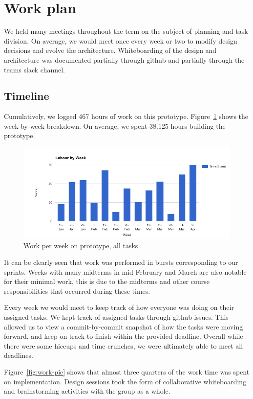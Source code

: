 \section{Work plan}
We held many meetings throughout the term on the subject of planning and task division.
On average, we would meet once every week or two to modify design decisions and evolve the architecture.
Whiteboarding of the design and architecture was documented partially through github and partially through the teams slack channel.

\subsection{Timeline}
Cumulatively, we logged 467 hours of work on this prototype.
Figure~\ref{fig:work-per-week} shows the week-by-week breakdown.
On average, we spent 38.125 hours building the prototype. 

\begin{figure}[tbph]
  \centering
  \includegraphics[width=0.85\linewidth]{graphics/work-per-week}
  \caption{Work per week on prototype, all tasks}
  \label{fig:work-per-week}
\end{figure}

It can be clearly seen that work was performed in bursts corresponding to our sprints.
Weeks with many midterms in mid February and March are also notable for their minimal work, this is due to the midterms and other course responsibilities that occurred during these times.

Every week we would meet to keep track of how everyone was doing on their assigned tasks.
We kept track of assigned tasks through github issues.
This allowed us to view a commit-by-commit snapshot of how the tasks were moving forward, and keep on track to finish within the provided deadline.
Overall while there were some hiccups and time crunches, we were ultimately able to meet all deadlines.

Figure~\ref{fig:work-pie} shows that almost three quarters of the work time was spent on implementation.
Design sessions took the form of collaborative whiteboarding and brainstorming activities with the group as a whole. 

